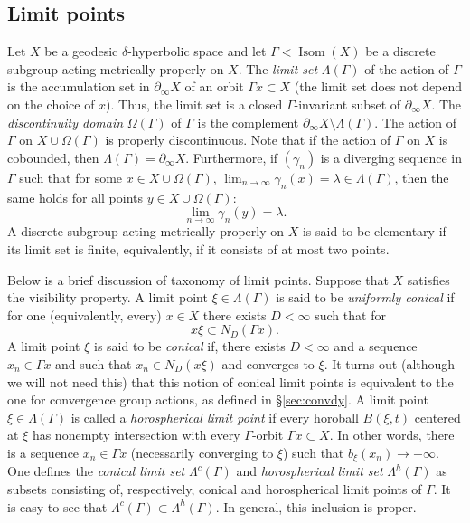 \documentclass[12pt]{amsbook}%
\theoremstyle{definition}
\theoremstyle{remark}
\numberwithin{section}{chapter}
\numberwithin{subsection}{section}
\numberwithin{figure}{chapter}
\DeclareMathOperator{\Isom}{Isom}
\def\Ga{\Gamma}
\def\ga{\gamma}
\def\La{\Lambda}
\def\la{\lambda}
\def\geo{\partial_\infty}
\begin{document}
\subsection{Limit points}


Let $X$ be a %
geodesic $\delta$-hyperbolic space and let $\Ga< \Isom(X)$ be a discrete subgroup acting metrically properly 
on $X$. The {\em limit set} $\Lambda(\Gamma)$ \index{$\La(\Ga)$, the limit set} 
of the action of $\Ga$  is the accumulation set in $\geo X$ of an orbit $\Gamma x\subset X$ (the limit set does not depend on the choice of $x$). Thus, the limit set is a closed $\Ga$-invariant subset of $\geo X$. 
The \index{$\Omega(\Ga)$, discontinuity domain} 
{\em discontinuity domain} $\Omega(\Ga)$ of $\Ga$ is the complement $\geo X \setminus \La(\Ga)$. 
The action of $\Ga$ on $X\cup \Omega(\Ga)$ is properly discontinuous. 
Note that if the action of $\Ga$ on $X$ is cobounded, 
then $\La(\Ga)=\geo X$. 
Furthermore, if $(\ga_n)$ is a diverging sequence in $\Ga$ such that for some $x\in X\cup \Omega(\Ga)$, 
$\lim_{n\to\infty} \ga_n(x)=\la\in \La(\Ga)$, then the same holds for all points $y\in X\cup \Omega(\Ga)$:
$$
\lim_{n\to\infty} \ga_n(y)=\la. 
$$
A discrete subgroup acting metrically properly on $X$ is said to be elementary if its limit set is finite, equivalently, 
if it consists of at most two points. 

\medskip 
Below is a brief discussion of taxonomy of limit points. Suppose that $X$ satisfies the visibility property. 
A limit point $\xi\in \La(\Ga)$ is said to be {\em uniformly conical} if for one (equivalently, every) $x\in X$ there 
exists $D<\infty$ such that for 
$$
x\xi \subset N_D(\Ga x). 
$$
A limit point $\xi$ is said to be {\em conical} if, there exists $D<\infty$ and 
a sequence $x_n\in \Ga x$ and  such that $x_n\in N_D(x\xi)$ and converges to $\xi$. It turns out (although we will not need this) that this notion of conical limit points is equivalent to the one for convergence group actions, as defined 
in \S \ref{sec:convdy}.  A limit point 
$\xi\in \La(\Ga)$ is called a {\em horospherical limit point} if every  horoball $B(\xi, t)$ centered at $\xi$ has nonempty intersection with every $\Ga$-orbit $\Ga x\subset X$.  In other words, there is a sequence $x_n\in \Ga x$ (necessarily converging to $\xi$) such that $b_\xi(x_n)\to-\infty$.    One defines the {\em conical limit set} $\La^c(\Ga)$ and {\em horospherical limit set} $\La^h(\Ga)$ as subsets consisting of, respectively, conical and horospherical limit points of $\Ga$. It is easy to see that $\La^c(\Ga)\subset \La^h(\Ga)$. In general, this inclusion is proper. 
\end{document}
